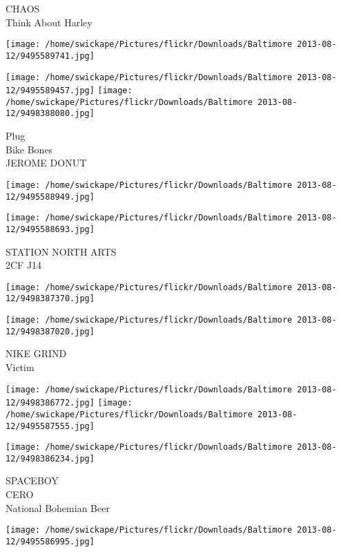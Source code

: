 \documentclass[10pt,letterpaper]{article}
\begin{document}
CHAOS\\
Think About Harley\\
\pagebreak

\texttt{[image: /home/swickape/Pictures/flickr/Downloads/Baltimore 2013-08-12/9495589741.jpg]}

\vspace{0.25in}
\texttt{[image: /home/swickape/Pictures/flickr/Downloads/Baltimore 2013-08-12/9495589457.jpg]}
\texttt{[image: /home/swickape/Pictures/flickr/Downloads/Baltimore 2013-08-12/9498388080.jpg]}

Plug\\
Bike Bones\\
JEROME DONUT\\
\pagebreak

\texttt{[image: /home/swickape/Pictures/flickr/Downloads/Baltimore 2013-08-12/9495588949.jpg]}

\vspace{0.25in}
\texttt{[image: /home/swickape/Pictures/flickr/Downloads/Baltimore 2013-08-12/9495588693.jpg]}

STATION NORTH ARTS\\
2CF J14\\
\pagebreak

\texttt{[image: /home/swickape/Pictures/flickr/Downloads/Baltimore 2013-08-12/9498387370.jpg]}

\vspace{0.25in}
\texttt{[image: /home/swickape/Pictures/flickr/Downloads/Baltimore 2013-08-12/9498387020.jpg]}

NIKE GRIND\\
Victim\\
\pagebreak

\texttt{[image: /home/swickape/Pictures/flickr/Downloads/Baltimore 2013-08-12/9498386772.jpg]}
\texttt{[image: /home/swickape/Pictures/flickr/Downloads/Baltimore 2013-08-12/9495587555.jpg]}

\vspace{0.25in}
\texttt{[image: /home/swickape/Pictures/flickr/Downloads/Baltimore 2013-08-12/9498386234.jpg]}

SPACEBOY\\
CERO\\
National Bohemian Beer\\
\pagebreak

\texttt{[image: /home/swickape/Pictures/flickr/Downloads/Baltimore 2013-08-12/9495586995.jpg]}
\end{document}
